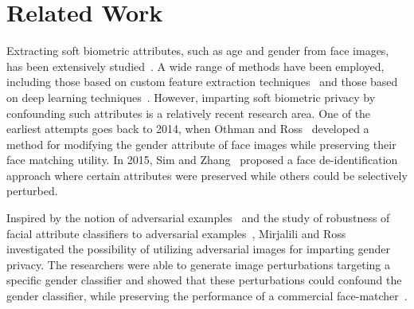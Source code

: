\documentclass[10pt,twocolumn,letterpaper]{article}
\begin{document}
\section{Related Work}


Extracting soft biometric attributes, such as age and gender from face images, has been extensively studied~\cite{becerra_age_2017,gunther_affact_2016,dantcheva_what_2016}. A wide range of methods have been employed, including those based on custom feature extraction techniques~\cite{bukar_automatic_2016} and those based on deep learning techniques~\cite{levi_age_2015,mansanet_local_2016,jia_gender_2016,castrillon_descriptors_2017,gunther_affact_2016}.  However,  imparting soft biometric privacy by confounding such attributes is a relatively recent research area. One of the earliest attempts goes back to 2014, when Othman and Ross~\cite{othman_privacy_2014} developed a method for modifying the gender attribute of face images while preserving their face matching utility. In 2015, Sim and Zhang~\cite{sim_controllable_2015} proposed a face de-identification approach where certain attributes were  preserved while others could be selectively perturbed.

Inspired by the notion of adversarial examples~\cite{szegedy_intriguing_2013,akhtar_threat_2018} and the study of robustness of facial attribute classifiers to adversarial examples~\cite{rozsa_are_2016_long}, Mirjalili and Ross~\cite{mirjalili_soft_2017} investigated the possibility of utilizing adversarial images for imparting gender privacy. The researchers were able to generate image perturbations targeting a specific gender classifier and showed that these perturbations could confound the gender classifier, while preserving the performance of a commercial face-matcher~\cite{mirjalili_soft_2017}.  
\end{document}
